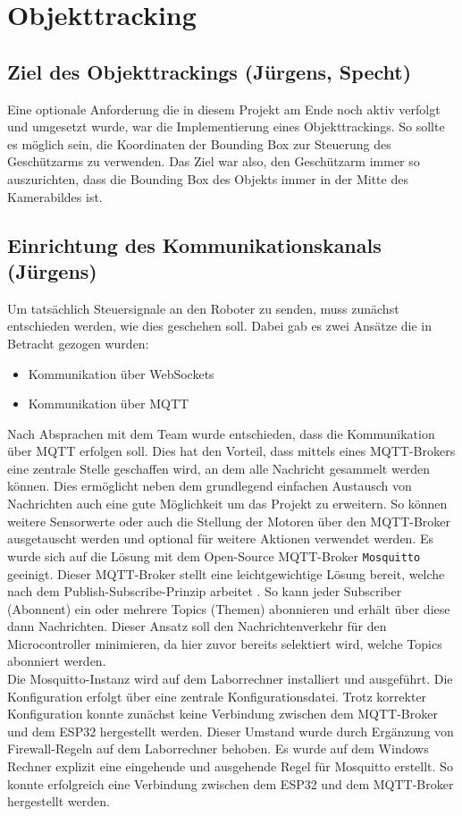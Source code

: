 \chapter{Objekttracking}
\section{Ziel des Objekttrackings (Jürgens, Specht)}
Eine optionale Anforderung die in diesem Projekt am Ende noch aktiv verfolgt und umgesetzt wurde, war die Implementierung eines Objekttrackings. So sollte es möglich sein, die Koordinaten der Bounding Box zur Steuerung des Geschützarms zu verwenden. Das Ziel war also, den Geschützarm immer so auszurichten, dass die Bounding Box des Objekts immer in der Mitte des Kamerabildes ist. 

\section{Einrichtung des Kommunikationskanals (Jürgens)}
Um tatsächlich Steuersignale an den Roboter zu senden, muss zunächst entschieden werden, wie dies geschehen soll. Dabei gab es zwei Ansätze die in Betracht gezogen wurden: 
\begin{itemize}
    \item Kommunikation über WebSockets
    \item Kommunikation über MQTT
\end{itemize}
Nach Absprachen mit dem Team wurde entschieden, dass die Kommunikation über MQTT erfolgen soll. Dies hat den Vorteil, dass mittels eines MQTT-Brokers eine zentrale Stelle geschaffen wird, an dem alle Nachricht gesammelt werden können. Dies ermöglicht neben dem grundlegend einfachen Austausch von Nachrichten auch eine gute Möglichkeit um das Projekt zu erweitern. So können weitere Sensorwerte oder auch die Stellung der Motoren über den MQTT-Broker ausgetauscht werden und optional für weitere Aktionen verwendet werden. Es wurde sich auf die Lösung mit dem Open-Source MQTT-Broker \texttt{Mosquitto} geeinigt. Dieser MQTT-Broker stellt eine leichtgewichtige Lösung bereit, welche nach dem Publish-Subscribe-Prinzip arbeitet \cite{Mosquitto}. So kann jeder Subscriber (Abonnent) ein oder mehrere Topics (Themen) abonnieren und erhält über diese dann Nachrichten. Dieser Ansatz soll den Nachrichtenverkehr für den Microcontroller minimieren, da hier zuvor bereits selektiert wird, welche Topics abonniert werden. 
\\ 
Die Mosquitto-Instanz wird auf dem Laborrechner installiert und ausgeführt. Die Konfiguration erfolgt über eine zentrale Konfigurationsdatei. Trotz korrekter Konfiguration konnte zunächst keine Verbindung zwischen dem MQTT-Broker und dem ESP32 hergestellt werden. Dieser Umstand wurde durch Ergänzung von Firewall-Regeln auf dem Laborrechner behoben. Es wurde auf dem Windows Rechner explizit eine eingehende und ausgehende Regel für Mosquitto erstellt. So konnte erfolgreich eine Verbindung zwischen dem ESP32 und dem MQTT-Broker hergestellt werden.

